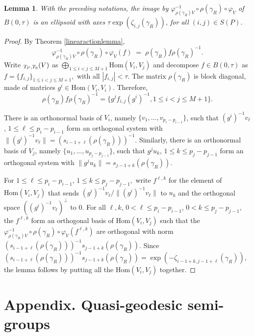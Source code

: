 \documentclass[10pt]{amsart}
\newcommand{\NoChangel}[1]{%
\expandafter\let\csname old\string#1\endcsname=#1
\let#1=\relax
\newcommand{#1}{\mathop{\mathcode`l="716C\csname old\string#1\endcsname\mathcode`l="7160}\displaylimits}%
}
\newtheorem{lemma}[theorem]{Lemma}
\let\g\gamma
\DeclareMathOperator{\nil}{Nil}\NoChangel{\nil}
\begin{document}
\begin{lemma} With the preceding notations, the image by \hbox{\(\varphi_{\rho(\g_R)V}^{-1}\circ \rho(\g_R) \circ \varphi_V \)} of \(B(0, \tau) \) is an ellipsoid with axes
\(\tau \exp (\zeta_{i, j }(\g_R))\), for all \((i,j) \in S(P)\). \end{lemma}
\begin{proof} By Theorem \ref{linearactionlemma},
\[
 \varphi_{\rho(\g_R) V}^{-1}\circ \rho(\g_R) \circ \varphi_V (f) \; = \; \rho(\g_R) f \rho(\g_R)^{-1}.
\]
Write \(\nil_{T_P,T_0}(V)\) as \(\bigoplus_{1\le i<j \le M+1} \text{Hom}(V_i,V_j)\) and decompose \(f \in B(0, \tau) \) as \(f = \{ f_{i, j } \}_{1\le i<j \le M+1}, \) with all \(|f_{i,j} |< \tau\). The matrix \(\rho(\g_R) \) is block diagonal, made of matrices \(g^i \in \text{Hom}(V_i,V_i)\). Therefore,
\[
 \rho(\g_R) f \rho(\g_R)^{-1} = \{ g^jf_{i,j} (g^i)^{-1}, 1\le i<j \le M+1\}.
\]

There is an orthonormal basis of \(V_i\), namely \(\{v_1, \ldots, v_{p_i - p_{i-1}}\}\), such that \((g^i)^{-1}v_\ell\), \(1\le \ell \le p_i -p_{i-1}\) form an orthogonal system with \(\| (g^i)^{-1} v_\ell \| = (s_{i-1+\ell}(\rho (\g_R)))^{-1} \). Similarly, there is an orthonormal basis of \(V_j\), namely \(\{u_1, \ldots, u_{p_j - p_{j-1}}\}\), such that \(g^j u_k\), \(1 \le k \le p_j -p_{j-1}\) form an orthogonal system with \(\| g^j u_k \| = s_{j-1+k} (\rho (\g_R)) \).

For \(1\leq \ell \leq p_i - p_{i-1}\), \(1\leq k \leq p_j -p_{j-1}, \) write \(f^{ \ell,k } \) for the element of \(\text{Hom}(V_i,V_j)\) that sends \((g^i)^{-1}v_\ell/ \|(g^i)^{-1}v_\ell \| \) to \(u_k \) and the orthogonal space \(((g^i)^{-1}v_\ell)^\perp \) to \(0 \). For all \(\ell, k\), \(0< \ell \le p_i- p_{i-1}\), \(0< k \leq p_j - p_{j-1}, \) the \(f^{\ell,k} \) form an orthogonal basis of \(\text{Hom}(V_i,V_j)\) such that the \(\varphi_{\rho(\g_R)V}^{-1}\circ \rho(\g_R) \circ \varphi_V (f^{\ell, k}) \) are orthogonal with norm \((s_{i-1+\ell}(\rho (\g_R)))^{-1} s_{j-1+k} (\rho (\g_R)) \). Since \((s_{i-1+\ell}(\rho (\g_R)))^{-1} s_{j-1+k} (\rho (\g_R)) = \exp (-\zeta_{i-1+k, j-1+\ell }(\g_R))\), the lemma follows by putting all the \(\text{Hom}(V_i,V_j)\) together. \end{proof}


\appendix
\section*{Appendix. Quasi-geodesic semi-groups}
\end{document}
